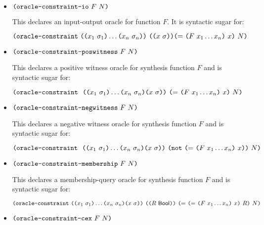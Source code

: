 \documentclass[english,a4paper,10pt]{article}
\begin{document}
\begin{itemize}
\item $\texttt{(}\texttt{oracle-constraint-io}\mbox{ }F\mbox{ } N\texttt{)}$

This declares an input-output oracle for function $F$. 
It is syntactic sugar for:


$\texttt{(}\texttt{oracle-constraint}\mbox{ } \texttt{(}\texttt{(}x_1\mbox{ }\sigma_1\texttt{)} \ldots \texttt{(}x_n\mbox{ }\sigma_n\texttt{)}\texttt{)}\mbox{ }
\texttt{(}\texttt{(}x \mbox{ }\sigma\texttt{)}\texttt{)}
\texttt{(}{\tt=}\mbox{ } \texttt{(}F \mbox{ } x_1 \ldots x_n\texttt{)}\mbox{ }  x\texttt{)}\mbox{ }N
\texttt{)}
$


\item$\texttt{(}\texttt{oracle-constraint-poswitness}\mbox{ }F\mbox{ } N\texttt{)} $

This declares a positive witness oracle for synthesis function $F$ and is syntactic sugar for:

$\texttt{(}\texttt{oracle-constraint}\mbox{ } 
\mbox{ }
\texttt{(}\texttt{(}x_1\mbox{ }\sigma_1\texttt{)} \ldots \texttt{(}x_n\mbox{ }\sigma_n\texttt{)} \texttt{(}x \mbox{ }\sigma\texttt{)}\texttt{)}\mbox{ }
\texttt{(}{\tt=}\mbox{ } \texttt{(}F \mbox{ } x_1 \ldots x_n\texttt{)}\mbox{ }  x\texttt{)}\mbox{ }N
\texttt{)}
$

\item$\texttt{(}\texttt{oracle-constraint-negwitness}\mbox{ }F\mbox{ } N\texttt{)}$

This declares a negative witness oracle for synthesis function $F$ and  is syntactic sugar for:


$\texttt{(}\texttt{oracle-constraint}\mbox{ } 
\mbox{ }
\texttt{(}\texttt{(}x_1\mbox{ }\sigma_1\texttt{)} \ldots \texttt{(}x_n\mbox{ }\sigma_n\texttt{)} \texttt{(}x \mbox{ }\sigma\texttt{)}\texttt{)}\mbox{ }
\texttt{(}{\tt not} \mbox{ } \texttt{(}{\tt=} \mbox{ } \texttt{(}F \mbox{ } x_1 \ldots x_n\texttt{)}\mbox{ }  x\texttt{)}\texttt{)} \mbox{ } N\texttt{)}
$


\item$\texttt{(}\texttt{oracle-constraint-membership}\mbox{ }F\mbox{ } N\texttt{)} $

This declares a membership-query oracle for synthesis function $F$ and is syntactic sugar for:


$\paren{\constraintoraclekwd \mbox{ }
\paren{\paren{x_1\mbox{ }\sigma_1} \ldots \paren{x_n\mbox{ }\sigma_n} \paren{x \mbox{ }\sigma}}\mbox{ }
\paren{\paren{R \mbox{ } \sbool}}\mbox{ } 
%
\paren{{\tt=} \mbox{ } \paren{{\tt=}\mbox{ } \paren{F \mbox{ } x_1 \ldots x_n } \mbox{ }  x} \mbox{ } R}  \mbox{ }N}
$

% 

\item$\texttt{(}\texttt{oracle-constraint-cex}\mbox{ }F\mbox{ } N\texttt{)} $


\end{itemize}
\end{document}
